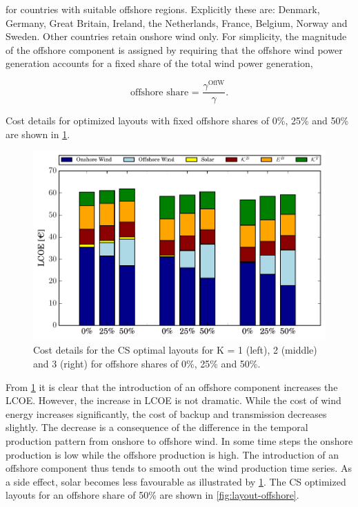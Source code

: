 \documentclass[a4paper, 12pt, sort&compress]{elsarticle}%
\begin{document}
for countries with suitable offshore regions. Explicitly these are: Denmark,
Germany, Great Britain, Ireland, the Netherlands, France, Belgium, Norway
and Sweden. Other countries retain onshore wind only. For simplicity,
the magnitude of the offshore component is assigned by requiring that
the offshore wind power generation accounts for a fixed share of the
total wind power generation,

\begin{equation}
  \label{eq:12}
  \text{offshore share = }\frac{\gamma^{\text{OffW}}}{\gamma}.
\end{equation}

Cost details for optimized layouts with fixed offshore shares of 0\%, 25\% and
50\% are shown in \cref{fig:cost-offshore}.

\begin{figure}[h!]
  \centering
  \includegraphics[width = \columnwidth]{costOffshoreVE50}
  \caption{Cost details for the CS optimal layouts for K = 1 (left),
    2 (middle) and 3 (right) for offshore shares of 0\%, 25\% and 50\%.}
  \label{fig:cost-offshore}
\end{figure}

From \cref{fig:cost-offshore} it is clear that the introduction of an
offshore component increases the LCOE. However, the increase in LCOE
is not dramatic. While the cost of wind energy increases
significantly, the cost of backup and transmission decreases
slightly. The decrease is a consequence of the difference in the
temporal production pattern from onshore to offshore wind. In some
time steps the onshore production is low while the offshore production
is high. The introduction of an offshore component thus tends to
smooth out the wind production time series. As a side effect, solar
becomes less favourable as illustrated by
\cref{fig:cost-offshore}. The CS optimized layouts for an offshore
share of 50\% are shown in \cref{fig:layout-offshore}.
\end{document}
